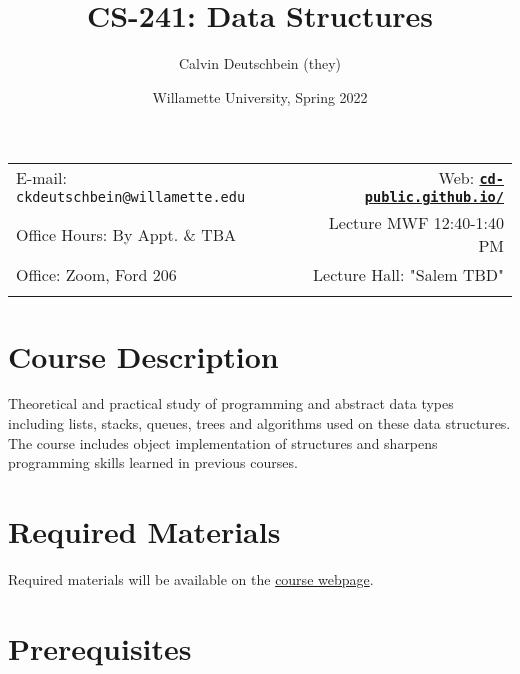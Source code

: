 \documentclass[11pt]{article}
\title{CS-241: Data Structures}
\author{Calvin Deutschbein (they)}
\date{Willamette University, Spring	 2022}
\newcommand{\blankline}{\quad\pagebreak[2]}
\begin{document}
\maketitle

\blankline

\begin{tabular*}{.93\textwidth}{@{\extracolsep{\fill}}lr}


E-mail: \texttt{ckdeutschbein@willamette.edu} & Web: \href{https://cd-public.github.io/courses/data_structures/241f21.html}{\tt\bf cd-public.github.io/}  \\

 Office Hours: By Appt. \& TBA  &  Lecture MWF 12:40-1:40 PM \\

 Office: Zoom, Ford 206 & Lecture Hall: "Salem TBD" \\
 & \\
\hline
\end{tabular*}

\vspace{5 mm}


\section*{Course Description}

Theoretical and practical study of programming and abstract data types including lists, stacks, queues, trees and algorithms used on these data structures. The course includes object implementation of structures and sharpens programming skills learned in previous courses.


\section*{Required Materials}

Required materials will be available on the \href{https://cd-public.github.io/courses/data_structures/r-241f21.html}{course webpage}.



\section*{Prerequisites}
\end{document}
